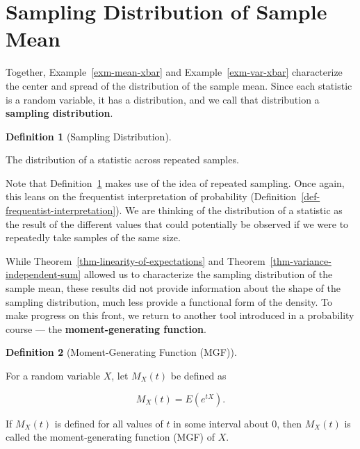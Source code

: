 \documentclass[
  letterpaper,
  DIV=11,
  numbers=noendperiod]{scrreprt}
\theoremstyle{definition}
\newtheorem{definition}{Definition}[chapter]
\theoremstyle{plain}
\theoremstyle{definition}
\theoremstyle{remark}
\begin{document}
\section{Sampling Distribution of Sample
Mean}\label{sampling-distribution-of-sample-mean}

Together, Example~\ref{exm-mean-xbar} and Example~\ref{exm-var-xbar}
characterize the center and spread of the distribution of the sample
mean. Since each statistic is a random variable, it has a distribution,
and we call that distribution a \textbf{sampling distribution}.

\begin{definition}[Sampling
Distribution]\protect\hypertarget{def-sampling-distribution}{}\label{def-sampling-distribution}

The distribution of a statistic across repeated samples.

\end{definition}

Note that Definition~\ref{def-sampling-distribution} makes use of the
idea of repeated sampling. Once again, this leans on the frequentist
interpretation of probability
(Definition~\ref{def-frequentist-interpretation}). We are thinking of
the distribution of a statistic as the result of the different values
that could potentially be observed if we were to repeatedly take samples
of the same size.

While Theorem~\ref{thm-linearity-of-expectations} and
Theorem~\ref{thm-variance-independent-sum} allowed us to characterize
the sampling distribution of the sample mean, these results did not
provide information about the shape of the sampling distribution, much
less provide a functional form of the density. To make progress on this
front, we return to another tool introduced in a probability course ---
the \textbf{moment-generating function}.

\begin{definition}[Moment-Generating Function
(MGF)]\protect\hypertarget{def-mgf}{}\label{def-mgf}

For a random variable \(X\), let \(M_X(t)\) be defined as

\[M_X(t) = E\left(e^{tX}\right).\]

If \(M_X(t)\) is defined for all values of \(t\) in some interval about
0, then \(M_X(t)\) is called the moment-generating function (MGF) of
\(X\).

\end{definition}
\end{document}
